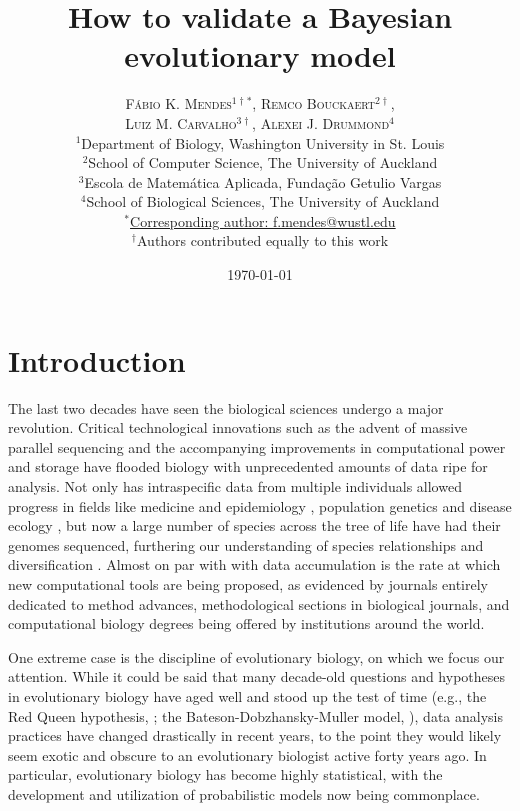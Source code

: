 \documentclass[oneside]{article}
\title{How to validate a Bayesian evolutionary model} %
\author{\textsc{F\'{a}bio K. Mendes$^{1\dagger*}$}, \textsc{Remco Bouckaert$^{2\dagger}$},\\
\textsc{Luiz M. Carvalho$^{3\dagger}$}, \textsc{Alexei J. Drummond$^{4}$} \\
\small $^1$Department of Biology, Washington University in St. Louis\\
\small $^2$School of Computer Science, The University of Auckland\\
\small $^3$Escola de Matem\'{a}tica Aplicada, Fundaç\~{a}o Getulio Vargas\\
\small $^4$School of Biological Sciences, The University of Auckland\\
\small
\href{mailto:f.mendes@auckland.ac.nz}{$^*$Corresponding author: f.mendes@wustl.edu}\\
{\small $^\dagger$Authors contributed equally to this work}
}
\date{\today} %
\begin{document}
\maketitle


\section*{Introduction}
The last two decades have seen the biological sciences undergo a major revolution.
Critical technological innovations such as the advent of massive parallel sequencing and the accompanying improvements in computational power and storage have flooded biology with unprecedented amounts of data ripe for analysis.
Not only has intraspecific data from multiple individuals allowed progress in fields like medicine and epidemiology
\citep[e.g.,][]{1000g,humanmicrobiome,neafsey15}, population genetics \citep[e.g.,][]{lynch07,lack16,demanuel16} and disease ecology \citep[e.g.,][]{rosenblum13,bates18}, but now a large number of species across the tree of life have had their genomes sequenced, furthering our understanding of species relationships and diversification \citep[e.g.,][]{pease2016,kawahara19,upham19}.
Almost on par with with data accumulation is the rate at which new computational tools are being proposed, as evidenced by journals entirely dedicated to method advances, methodological sections in biological journals, and computational biology degrees being offered by institutions around the world.

One extreme case is the discipline of evolutionary biology, on which we focus our attention.
While it could be said that many decade-old questions and hypotheses in evolutionary biology have aged well and stood up the test of time (e.g., the Red Queen hypothesis, \citealt{vanvalen73,lively87,morran11,gibson15}; the Bateson-Dobzhansky-Muller model, \citealt{dob36,muller40,hopkins12,roda17}), data analysis practices have changed drastically in recent years, to the point they would likely seem exotic and obscure to an evolutionary biologist active forty years ago. 
In particular, evolutionary biology has become highly statistical, with the development and utilization of probabilistic models now being commonplace.
\end{document}
